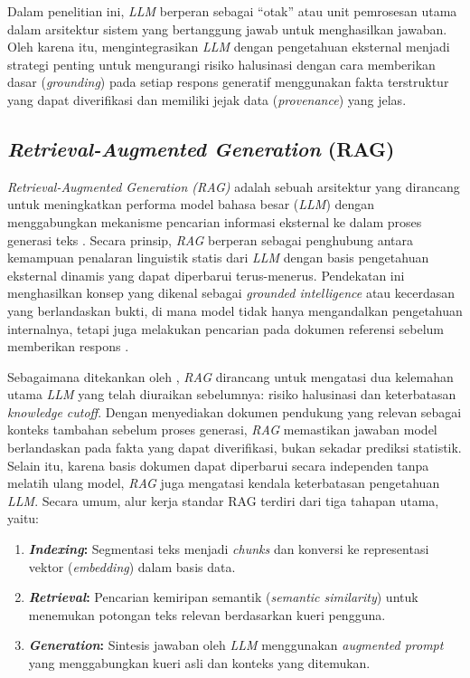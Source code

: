 Dalam penelitian ini, \textit{LLM} berperan sebagai ``otak'' atau unit pemrosesan utama dalam arsitektur sistem yang bertanggung jawab untuk menghasilkan jawaban. Oleh karena itu, mengintegrasikan \textit{LLM} dengan pengetahuan eksternal menjadi strategi penting untuk mengurangi risiko halusinasi dengan cara memberikan dasar (\textit{grounding}) pada setiap respons generatif menggunakan fakta terstruktur yang dapat diverifikasi dan memiliki jejak data (\textit{provenance}) yang jelas.

\subsection{\textit{Retrieval-Augmented Generation} (RAG)}

\textit{Retrieval-Augmented Generation (RAG)} adalah sebuah arsitektur yang dirancang untuk meningkatkan performa model bahasa besar (\textit{LLM}) dengan menggabungkan mekanisme pencarian informasi eksternal ke dalam proses generasi teks \citep{lewis2021retrievalaugmentedgenerationknowledgeintensivenlp}. Secara prinsip, \textit{RAG} berperan sebagai penghubung antara kemampuan penalaran linguistik statis dari \textit{LLM} dengan basis pengetahuan eksternal dinamis yang dapat diperbarui terus-menerus. Pendekatan ini menghasilkan konsep yang dikenal sebagai \textit{grounded intelligence} atau kecerdasan yang berlandaskan bukti, di mana model tidak hanya mengandalkan pengetahuan internalnya, tetapi juga melakukan pencarian pada dokumen referensi sebelum memberikan respons \citep{Huang_2025}.

Sebagaimana ditekankan oleh \citet{Huang_2025}, \textit{RAG} dirancang untuk mengatasi dua kelemahan utama \textit{LLM} yang telah diuraikan sebelumnya: risiko halusinasi dan keterbatasan \textit{knowledge cutoff}. Dengan menyediakan dokumen pendukung yang relevan sebagai konteks tambahan sebelum proses generasi, \textit{RAG} memastikan jawaban model berlandaskan pada fakta yang dapat diverifikasi, bukan sekadar prediksi statistik. Selain itu, karena basis dokumen dapat diperbarui secara independen tanpa melatih ulang model, \textit{RAG} juga mengatasi kendala keterbatasan pengetahuan \textit{LLM}. Secara umum, alur kerja standar RAG terdiri dari tiga tahapan utama, yaitu:

\begin{enumerate}[label=\textbf{\Alph*.}, leftmargin=0.75cm]
    \item \textbf{\textit{Indexing}:} Segmentasi teks menjadi \textit{chunks} dan konversi ke representasi vektor (\textit{embedding}) dalam basis data.

    \item \textbf{\textit{Retrieval}:} Pencarian kemiripan semantik (\textit{semantic similarity}) untuk menemukan potongan teks relevan berdasarkan kueri pengguna.

    \item \textbf{\textit{Generation}:} Sintesis jawaban oleh \textit{LLM} menggunakan \textit{augmented prompt} yang menggabungkan kueri asli dan konteks yang ditemukan.
\end{enumerate}


